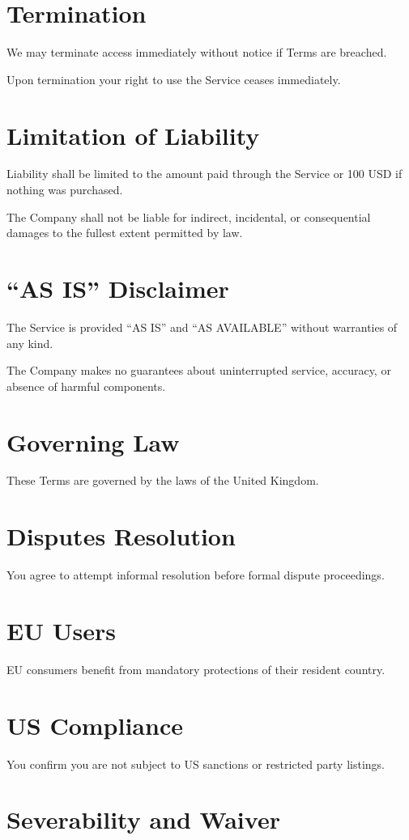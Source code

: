 \documentclass[11pt, a4paper]{report}
\begin{document}
\begin{itemize}
\section*{Termination}
We may terminate access immediately without notice if Terms are breached.

Upon termination your right to use the Service ceases immediately.

\section*{Limitation of Liability}
Liability shall be limited to the amount paid through the Service or 100 USD if nothing was purchased.

The Company shall not be liable for indirect, incidental, or consequential damages to the fullest extent permitted by law.

\section*{``AS IS'' Disclaimer}
The Service is provided ``AS IS'' and ``AS AVAILABLE'' without warranties of any kind.

The Company makes no guarantees about uninterrupted service, accuracy, or absence of harmful components.

\section*{Governing Law}
These Terms are governed by the laws of the United Kingdom.

\section*{Disputes Resolution}
You agree to attempt informal resolution before formal dispute proceedings.

\section*{EU Users}
EU consumers benefit from mandatory protections of their resident country.

\section*{US Compliance}
You confirm you are not subject to US sanctions or restricted party listings.

\section*{Severability and Waiver}


\end{itemize}
\end{document}
